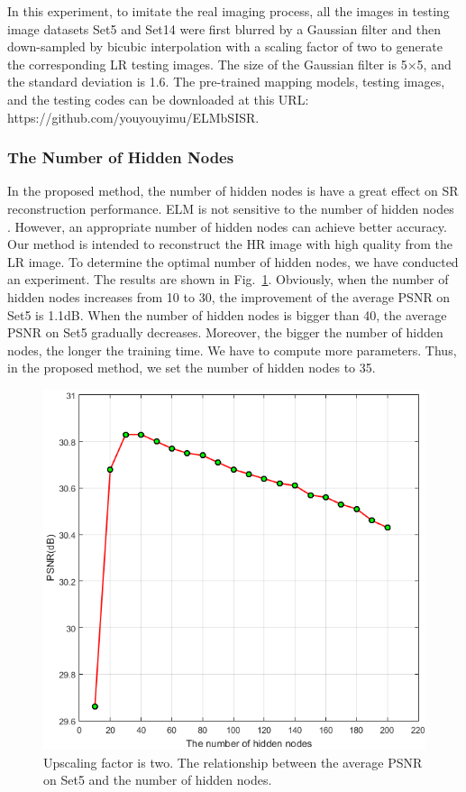 \documentclass[review,numbers,sort&compress]{elsarticle}  %
\begin{document}
In this experiment, to imitate the real imaging process, all the images in testing image datasets Set5 and Set14 were first blurred by a Gaussian filter and then down-sampled by bicubic interpolation with a scaling factor of two to generate the corresponding LR testing images. The size of the Gaussian filter is 5$\times$5, and the standard deviation is 1.6.
The pre-trained mapping models, testing images, and the testing codes can be downloaded at this URL: https://github.com/youyouyimu/ELMbSISR.

\subsubsection{The Number of Hidden Nodes}
In the proposed method, the number of hidden nodes is have a great effect on SR reconstruction performance. ELM is not sensitive to the number of hidden nodes \cite{huang2012extreme}. However, an appropriate number of hidden nodes can achieve better accuracy. Our method is intended to reconstruct the HR image with high quality from the LR image. To determine the optimal number of hidden nodes, we have conducted an experiment. The results are shown in Fig.~\ref{fig:hiddeNodes}. Obviously, when the number of hidden nodes increases from 10 to 30, the improvement of the average PSNR on Set5 is 1.1dB. When the number of hidden nodes is bigger than 40, the average PSNR on Set5 gradually decreases. Moreover, the bigger the number of hidden nodes, the longer the training time. We have to compute more parameters. Thus, in the proposed method, we set the number of hidden nodes to 35.

\begin{figure}[htbp]
  \centering
  \includegraphics[width=0.6\linewidth]{Fig_hiddenNodes.png}
  \caption{Upscaling factor is two. The relationship between the average PSNR on Set5 and the number of hidden nodes.}\label{fig:hiddeNodes}
\end{figure}
\end{document}
